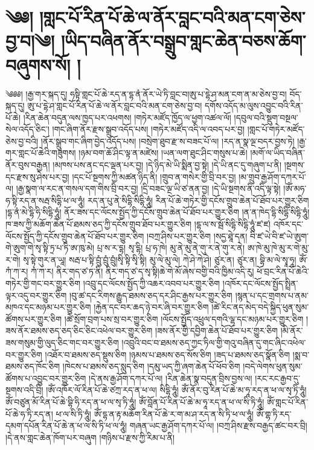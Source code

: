 \setcounter{footnote}{0} 
\chapter{༄༅། །གླང་པོ་རིན་པོ་ཆེ་ལ་ནོར་བླང་བའི་མན་ངག་ཅེས་བྱ་བ།༄། །ཡིད་བཞིན་ནོར་བསྒྲུབ་གླང་ཆེན་བཅས་ཆོག་བཞུགས་སོ། །}༄༅༅། །རྒྱ་གར་སྐད་དུ། ཧསྟི་གླང་པོ་ཆེ་རད་ན་དྷ་ནཾ་ནོར་ཡེ་ཏི་བླང་བ།ཨུ་པ་དྷེ་ཤ་མན་ངག་ན་མ་ཅེས་བྱ་བ། བོད་སྐད་དུ། ཨུ་པ་དྷེ་ཤ་གླང་པོ་རིན་པོ་ཆེ་ལ་ནོར་བླང་བའི་མན་ངག་ཅེས་བྱ་བ། དགོས་འདོད་མ་ལུས་འབྱུང་བའི་རིན་པོ་ཆེ། །རིན་ཆེན་བདུན་ལས་ཁྱད་པར་འཕགས། །གཏེར་མཛོད་ཁྱོད་ལ་ཕྱག་འཚལ་ལོ། །དབུལ་བའི་སྡུག་བསྔལ་སེལ་འདོད་ཅིང་། །གང་ཞིག་ནོར་རྫས་སྒྲུབ་འདོད་པས། །གཏེར་མཛོད་འདི་ལ་འབད་པར་བྱ། །གླང་པོ་གཏེར་མཛོད་ཅེས་བྱ་བའི། །ནོར་སྒྲུབ་གང་ཞིག་བྱེད་འདོད་པས། །བསྲེག་ཐུབ་རྫ་ས་བཟང་པོ་ལ། །རད་ན་སྣ་ལྔ་བདར་བྱས་ཏེ། །རྒྱ་གར་གླང་པོ་ཆེའི་གཟུགས། །ཉམ་བག་ཆོ་ཤིང་ལྟ་ན་མཛེས། །ཡན་ལག་ཐུང་ཤིང་གསུས་པ་ཆེ། །མགོ་ལ་ཡིད་བཞིན་ནོར་བུས་བརྒྱན། །མཁས་པས་ནང་དང་ལྡན་པར་བྱ། །དེ་ཉིད་མེ་ཡི་སྨིན་བྱ་སྟེ། །དེ་ཡི་ནང་དུ་གཞུག་པ་ནི། །སྔགས་དང་རྫས་སུ་ཤེས་པར་བྱ། །དང་པོ་སྔགས་ཀྱི་མཚན་ཉིད་ནི། །གྲུབ་ན་གསེར་གྱི་བྲི་བར་བྱ། །མ་གྲུབ་རྒྱ་ཤོག་དཀར་པོ་ལ། །རྒྱ་སྣག་ལ་རང་ན་གསལ་དག་གིས་བྲི་བར་བྱ། །དྲི་བཟང་ལྔ་ཡི་ཙ་ནན་བྱ། །དེ་ཡི་སྔགས་ནི་འདི་ལྟ་སྟེ། །ཨོཾ་མཧ་ཧ་སྟི་རད་ན་སརྦ་སིདྷི་ཕ་ལ་ཧཱུཾ། རད་ན་པུ་ནེ་སིདྷི་སིདྷི་ཧཱུཾ། རིན་པོ་ཆེ་གཏེར་གྱི་དངོས་གྲུབ་ཆེན་པོ་ཐོབ་པར་གྱུར་ཅིག །དྷ་ནཾ་མེ་དྷི་ཧི་སིདྷི་ཧཱུཾ། ནོར་ཟས་དང་ལོངས་སྤྱོད་ཀྱི་དངོས་གྲུབ་ཆེན་པོ་ཐོབ་པར་གྱུར་ཅིག །ན་ན་ཁེད་དྷི་སིདྷི་སིདྷི་ཧཱུཾ། ཁ་ཟས་ཀྱི་མཆོག་ཆེན་པོ་ཐམས་ཅད་ཀྱི་དངོས་གྲུབ་ཐོབ་པར་གྱུར་ཅིག །དྷ་ལ་ས་སྦོ་སིདྷི་སིདྷི་ཧཱུཾ་ཛ་ཛ། འཁོར་དང་ལོངས་སྤྱོད་ཀྱི་དངོས་གྲུབ་ཆེན་པོ་ཐོབ་པར་གྱུར་ཅིག །བཀྲ་ཤིས་པར་གྱུར་ཅིག །སདྱ་ཐཱེ་དན། བི་ཛ་ཡེ་བི་ཛ་ཡེ་ཨུག་གེ་ཨུག་གེ་སྭ་སྟི་ཏྲ་པ་ཏི་ཨ་ཁུ་མེ། པྲ་ས་ར་དྷ། སྭ་དྷི། པྲ་ཧ་ཁེ། མུ་ནེ་མུ་ནེ་གུ་ར་ནེ་གུ་ར་ནེ། ཨ་ཁེ་མུ་ཁེ་མུ་ར་གེ་མུ་ར་གེ། སྭ་སྟེ་གུར་ན་ཡཱ། སརྦ་པ་སྟི་བྲུཾ་བྲུཾ་བྲུཾ།སྭི་སྟི་སྭི་སྟི། མུ་ལེ་མུ་ལེ། ཀེ་ཤེ་ཀེ་ཤེ། ཙུར་ན། ཙུར་ན། བྷི་མ་ལེ་སྭཱ་ཧཱ། ཨོཾ་ཀཾ་ཀ་ར། ཀཾ་ཀ་ར། ནིར་གད་ཙ་ཏ་ནི། ནིར་གད་ཙ་ད་སྭ་སྟི།ཆེ་གེ་མོ་ཞེས་བགྱི་བའི་ཁྱིམ་འདི་རུ། ཕོ་བྲང་རིན་པོ་ཆེའི་གཏེར་གྱི་གང་བར་གྱུར་ཅིག །འབྲུ་དང་ལོངས་སྤྱོད་ཀྱི་འཆར་འབབ་པར་གྱུར་ཅིག །འཁོར་དང་ལོངས་སྤྱོད་སྤྲིན་ལྟར་འདུ་བར་གྱུར་ཅིག །བུ་ཚ་དང་རིགས་རྒྱུད་ཐམས་ཅད་དར་ཤིང་རྒྱས་པར་གྱུར་ཅིག །སྙན་པ་དང་གྲགས་པ་ནམ་མཁའ་དང་མཉམ་པར་གྱུར་ཅིག །རྐྱེན་དང་བར་ཆད་ཉེ་བར་ཞི་བར་གྱུར་ཅིག །ཚེ་རིང་ནད་མེད་བདེ་སྐྱིད་ཕུན་སུམ་ཚོགས་པར་གྱུར་ཅིག །ཚེ་སྲོག་བྲག་པས་སྲ་བར་གྱུར་ཅིག །ལོངས་སྤྱོད་འཕྲུལ་དགའི་ལྷ་དང་མཉམ་པར་གྱུར་ཅིག །ཟས་ནོར་ཐམས་ཅད་ཅད་ཅིང་ཅིང་འཕེལ་བར་གྱུར་ཅིག །ཟས་ནོར་གྱི་དབྱིག་ཆེན་པོ་ཐོབ་པར་གྱུར་ཅིག །མི་ནོར་ཟས་གསུམ་གྱི་ལུད་ཅིང་གང་བར་གྱུར་ཅིག །འབྲུའི་བང་བ་ཐམས་ཅད་ཀྱང་ཏིལ་གྱི་གའུ་བཞིན་དུ་གང་ཞིང་འཕེལ་བར་གྱུར་ཅིག །འཐོར་བ་ཐམས་ཅད་སྡུས་ཅིག །ཉམས་པ་ཐམས་ཅད་སོས་ཅིག །ཟད་པ་ཐམས་ཅད་སྣོན་ཅིག །སྨ་བ་ཐམས་ཅད་ཁོང་ཅིག །ཁེངས་པ་ཐམས་ཅད་སླུད་ཅིག །དམུ་ཡད་ཀྱི་ཞག་ཆེན་པོ་ཕོབ་ཅིག །བདེ་ལེགས་ཕུན་སུམ་ཚོགས་པ་འབྱུང་བར་གྱུར་ཅིག །དེ་ནས་རྒྱ་ཤོག་དཀར་པོ་ལ། །རིན་ཆེན་སྣ་བདུན་བྲིས་བྱས་ལ། །རང་རང་རྒྱབ་དུ་སྔགས་འདི་བྲི། །ཨོཾ་འཁོར་ལོ་རིན་པོ་ཆེ་ཙཀྲ་རད་ན་ཕ་ལ། སིདྷི་ཧཱུཾ། ཨོཾ་ནོར་བུ་རིན་པོ་ཆེ་མ་ཧཱ་རད་ན་ཕ་ལ་སྭ་ཏི་ཧཱུཾ།ཨོཾ་བཙུན་མོ་རིན་པོ་ཆེ་བྷི་ཧི་རད་ན་ཕ་ལ་སྭ་ཏི་ཧཱུཾ། ཨོཾ་བློན་པོ་རིན་པོ་ཆེ་མ་ཧཱ་རད་ན་ཕ་ལ་སི་ཏི་ཧཱུཾ། ཨོཾ་གླང་པོ་རིན་པོ་ཆེ་ཧ་ཏི་རད་ན། ཕ་ལ་སི་ཏི་ཧཱུཾ། ཨོཾ་དྷ་ན་རྟ་མཆོག་རིན་པོ་ཆེ་ར་ག་མ་ཤ་རད་ན་སི་ཏི་ཕ་ལ་ཧཱུཾ། ཨོཾ་གྷ་ཏི་རད་དམག་དཔོན་རིན་པོ་ཆེ་ན་ཕ་ལ་སི་ཏི་ཕ་ལ་ཧཱུཾ། གཞན་ཡང་རྒྱ་ཤོག་དཀར་པོ་ལ། །བཀྲ་ཤིས་རྫས་བརྒྱད་ཚང་བར་བྲི། །དེ་ནས་གླང་ཆེན་ཁོག་པར་བཞུག །གཉིས་པ་རྫས་ཀྱི་རིམ་པ་ནི། 